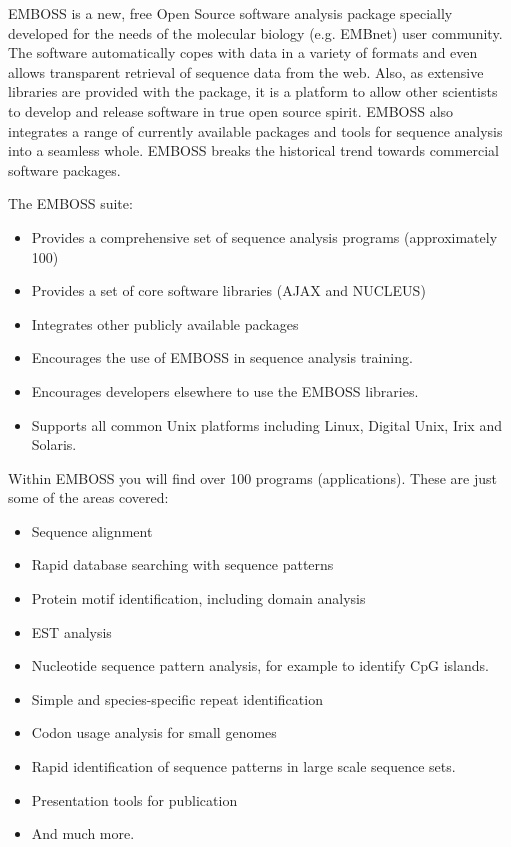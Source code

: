 \documentclass[12pt]{report}
\begin{document}
EMBOSS is a new, free Open Source software analysis package specially
 developed for the needs of the	molecular biology (e.g.
EMBnet)	user community.	The software automatically copes with data
in a variety of	formats	and even allows	transparent retrieval of
sequence data from the web. Also, as extensive libraries are provided
with the package, it is	a platform to allow other scientists to
develop	and release software in	true open source spirit. EMBOSS	also
integrates a range of currently	available packages and tools for
sequence analysis into a seamless whole. EMBOSS	breaks the historical
trend towards commercial software packages.

The EMBOSS suite:
\begin{itemize}
\item Provides a comprehensive set of sequence analysis	programs (approximately	100)
\item Provides a set of	core software libraries	(AJAX and NUCLEUS)
\item Integrates other publicly	available packages
\item Encourages the use of EMBOSS in sequence analysis	training.
\item Encourages developers elsewhere to use the EMBOSS	libraries.
\item Supports all common Unix platforms including Linux, Digital Unix,	Irix and Solaris.
\end{itemize}

Within EMBOSS you will find over 100 programs (applications). These
are just some of the areas covered:
\begin{itemize}
\item Sequence alignment
\item Rapid database searching with sequence patterns
\item Protein motif identification, including domain analysis
\item EST analysis
\item Nucleotide sequence pattern analysis, for	example	to identify CpG	islands.
\item Simple and species-specific repeat identification
\item Codon usage analysis for small genomes
\item Rapid identification of sequence patterns	in large scale sequence	sets.
\item Presentation tools for publication
\item And much more.
\end{itemize}
\end{document}

